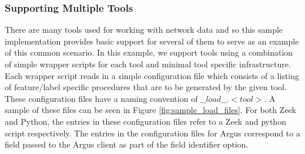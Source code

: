 \documentclass[conference]{IEEEtran}
\begin{document}
\subsubsection{Supporting Multiple Tools}\label{subsubsec:tool_support}
There are many tools used for working with network data and so this sample implementation provides basic support for several of them to serve as an example of this common scenario.
In this example, we support tools using a combination of simple wrapper scripts for each tool and minimal tool specific infrastructure.
Each wrapper script reads in a simple configuration file which consists of a listing of feature/label specific procedures that are to be generated by the given tool.
These configuration files have a naming convention of $\_\_load\_\_.<tool>$.
A sample of these files can be seen in Figure \ref{fig:sample_load_files}.
For both Zeek and Python, the entries in these configuration files refer to a Zeek and python script respectively.
The entries in the configuration files for Argus correspond to a field passed to the Argus client as part of the field identifier option.
\end{document}

